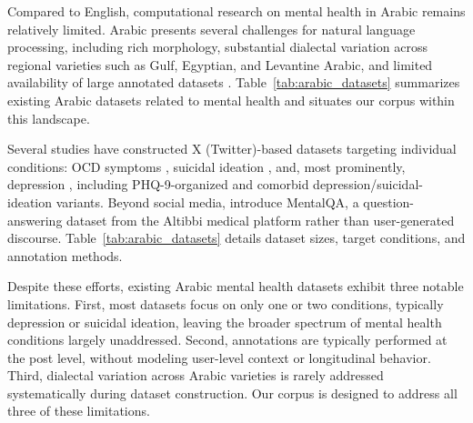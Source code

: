 \documentclass[11pt]{article}
\begin{document}
Compared to English, computational research on mental health in Arabic remains
relatively limited. Arabic presents several challenges for natural language
processing, including rich morphology, substantial dialectal variation across
regional varieties such as Gulf, Egyptian, and Levantine Arabic, and limited
availability of large annotated datasets \cite{darwish2021panoramic, alayba2025arabic}.
Table~\ref{tab:arabic_datasets} summarizes existing Arabic datasets related to
mental health and situates our corpus within this landscape.

Several studies have constructed X (Twitter)-based datasets targeting individual conditions: OCD symptoms \citep{al2024classification}, suicidal ideation \citep{abdulsalam2024detecting, baghdadi2022optimized}, and, most prominently, depression \citep{hassib2022aradepsu, almouzini2019detecting, elramly2021cairodep, maghraby2022mood}, including PHQ-9-organized \citep{maghraby2022mood} and comorbid depression/suicidal-ideation \citep{hassib2022aradepsu} variants. Beyond social media, \citet{alhuzali2024mentalqa} introduce MentalQA, a question-answering dataset from the Altibbi medical platform rather than user-generated discourse. Table~\ref{tab:arabic_datasets} details dataset sizes, target conditions, and annotation methods.

Despite these efforts, existing Arabic mental health datasets exhibit three
notable limitations. First, most datasets focus on only one or two conditions,
typically depression or suicidal ideation, leaving the broader spectrum of mental
health conditions largely unaddressed. Second, annotations are typically performed
at the post level, without modeling user-level context or longitudinal behavior.
Third, dialectal variation across Arabic varieties is rarely addressed
systematically during dataset construction. Our corpus is designed to address
all three of these limitations.
\end{document}
